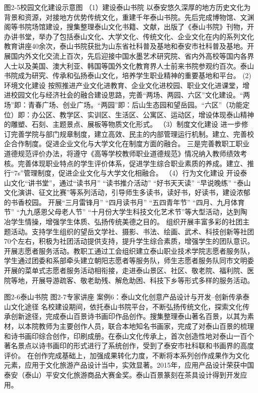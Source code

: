 图2-5校园文化建设示意图
（1）建设泰山书院
以泰安悠久深厚的地方历史文化为背景和资源，对接地方优势传统文化，重建千年泰山书院。先后完成博物馆、文渊阁等书院场馆建设，搜集整理泰山文化书籍、文献，出版了《泰山书院》刊物，开办讲书堂，举办了包括泰山文化、大学文化、传统文化、企业文化在内的系列文化教育讲座40余次，泰山书院获批为山东省社科普及基地和泰安市社科普及基地。开展国内外文化交流上百次，先后迎接中国水墨艺术研究院、省内外高校等国内各界人士以及美国、澳大利亚、韩国等国外文化教育界人士前来书院参观约百次。泰山书院成为研究、传承和弘扬泰山文化，培养学生职业精神的重要基地和平台。
(2)环境文化建设
按照推进产业文化进教育、企业文化进校园、职业文化进课堂，增进校园文化与经济社会的融合建设思路，完善“两场、两园、六区”文化建设。“两场”即：青春广场、创业广场。“两园”即：后山生态园和望岳园。“六区”（功能定位）即：办公区、教学区、实训区、生活区、公寓区、运动区，增设体现泰山精神的雕塑、石刻、主题景点、展板等物质文化形式。
（3）制度文化建设
进一步修订完善学院与部门规章制度，建立高效、民主的内部管理运行机制。建立、完善校企合作制度。促进企业文化与大学文化在制度方面的融合。
三是完善教职工职业道德规范评价办法，将遵守《高等学校教师职业道德规范》情况纳入教师绩效考核。完善体现职业特点的学生评价体系，促进学生综合职业素质的养成。建立、推行“7s”管理制度，促进企业文化与大学文化相融合。
（4）行为文化建设
开设泰山文化“讲书堂”，通过“读书月” “读书推介活动” “好书天天读” “早说晚练” “泰山文化演讲、征文比赛”等系列活动，引导师生多读书，读好书，好读书，建设浓郁的书香校园。
开展“三月雷锋月” “四月读书月” “五四青年节” “四月、九月体育节” “九九感恩父母老人节” “十月份大学生科技文化艺术节”等大型活动，达到陶冶学生情操，增强学生体质、弘扬传统美德之目的。
组织开展丰富多彩的社团主题活动。支持学生组织的望岳文学社、摄影、书法、绘画、武术、科技创新等社团70个左右，积极为社团活动提供支持，提升学生综合素质，增强学生的团队意识。
开展志愿者服务活动。教职工通过工会组织建立泰山职业技术学院志愿者服务队，学生通过团委和系部牵头建立朝阳志愿者等服务队，师生志愿者服务队同市文明委开展的菜单式志愿者服务活动相衔接，走进泰山景区、社区、敬老院、福利院、医院等地，开展导游疏客、敬老助残、解危助困、科技下乡等形式多样的服务活动。
   
图2-6泰山书院                   图2-7专家讲座
案例6：泰山文化创意产品设计与开发--创新传承泰山文化途径
名校建设期间，依托泰山书院平台，不断弘扬传统文化，探索文化传承创新途径，完成泰山百景诗书画印作品创作。搜集整理泰山著名百景，以其为素材，以本院教师为主要创作人员，联合本地知名书画家，完成了对泰山百景的梳理和诗书画印综合创作，印刷成册。在泰山文化传承上，首次创造性地对泰山一百个著名景点以诗书画印的形式进行了系统创作，受到了泰安市社科联和书画界的高度评价。
在创作完成基础上，加强成果转化力度，不断将本系列创作成果作为文化元素，应用于文化旅游产品设计当中，实效显著。2015年，应用产品设计荣获中国泰安（泰山）平安文化旅游商品大赛金奖。泰山百景篆刻在茶具设计得到开发应用。

